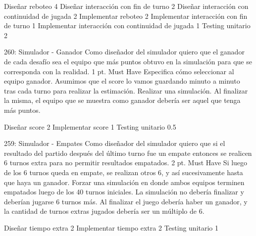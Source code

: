 \begin{taskstable}
 \task
 {Diseñar reboteo}
 {4}
 \task
 {Diseñar interacción con fin de turno}
 {2}
 \task
 {Diseñar interacción con continuidad de jugada}
 {2}
 \task
 {Implementar reboteo}
 {2}
 \task
 {Implementar interacción con fin de turno}
 {1}
 \task
 {Implementar interacción con continuidad de jugada}
 {1}
 \task
 {Testing unitario}
 {2}
\end{taskstable}

\vspace{1cm}


\sprintstory
{260: Simulador - Ganador}
{Como diseñador del simulador quiero que el ganador de cada desafío sea el equipo que más puntos obtuvo en la simulación para que se corresponda con la realidad.}
{1 pt.}
{Must Have}
{Especifica cómo seleccionar al equipo ganador. 
Asumimos que el score lo vamos guardando minuto a minuto tras cada turno para realizar la estimación.}
{Realizar una simulación. Al finalizar la misma, el equipo que se muestra como ganador debería ser aquel que tenga más puntos.}

\begin{taskstable}
 \task
 {Diseñar score}
 {2}
 \task
 {Implementar score}
 {1}
 \task
 {Testing unitario}
 {0.5}
\end{taskstable}

\vspace{1cm}


\sprintstory
{259: Simulador - Empates}
{Como diseñador del simulador quiero que si el resultado del partido después del último turno fue un empate entonces se realicen 6 turnos extra para no permitir resultados empatados.}
{2 pt.}
{Must Have}
{Si luego de los 6 turnos queda en empate, se realizan otros 6, y así sucesivamente hasta que haya un ganador.}
{Forzar una simulación en donde ambos equipos terminen empatados luego de los 40 turnos iniciales. La simulación no debería finalizar y deberían jugarse 6 turnos más. Al finalizar el juego debería haber un ganador, y la cantidad de turnos extras jugados debería ser un múltiplo de 6.}

\begin{taskstable}
 \task
 {Diseñar tiempo extra}
 {2}
 \task
 {Implementar tiempo extra}
 {2}
 \task
 {Testing unitario}
 {1}
\end{taskstable}

